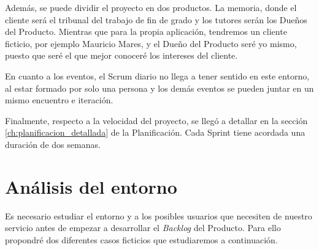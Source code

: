 \vspace{0.3cm}

Además, se puede dividir el proyecto en dos productos. La memoria, donde el cliente será el tribunal del trabajo de fin de grado y los tutores serán los Dueños del Producto. Mientras que para la propia aplicación, tendremos un cliente ficticio, por ejemplo Mauricio Mares, y el Dueño del Producto seré yo mismo, puesto que seré el que mejor conoceré los intereses del cliente.

\vspace{0.3cm}

En cuanto a los eventos, el Scrum diario no llega a tener sentido en este entorno, al estar formado por solo una persona y los demás eventos se pueden juntar en un mismo encuentro e iteración.

\vspace{0.3cm}

Finalmente, respecto a la velocidad del proyecto, se llegó a detallar en la sección \ref{ch:planificacion_detallada} de la Planificación. Cada Sprint tiene acordada una duración de dos semanas.

\newpage
\section{Análisis del entorno}

Es necesario estudiar el entorno y a los posibles usuarios que necesiten de nuestro servicio antes de empezar a desarrollar el \textit{Backlog} del Producto. Para ello propondré dos diferentes casos ficticios que estudiaremos a continuación.

